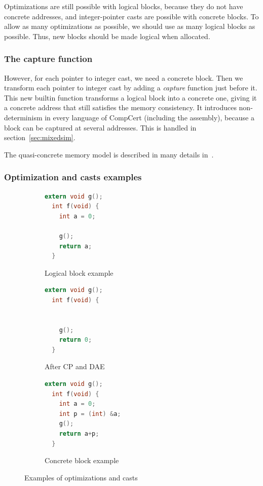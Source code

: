 Optimizations are still possible with logical blocks, because they do not have concrete addresses, and integer-pointer casts are possible with concrete blocks.
To allow as many optimizations as possible, we should use as many logical blocks as possible. Thus, new blocks should be made logical when allocated.

\subsubsection{The capture function}
However, for each pointer to integer cast, we need a concrete block. Then we transform each pointer to integer cast by adding a \textit{capture} function just before it. This new builtin function transforms a logical block into a concrete one, giving it a concrete address that still satisfies the memory consistency.
It introduces non-determinism in every language of CompCert (including the assembly), because a block can be captured at several addresses. This is handled in section~\ref{sec:mixedsim}.

The quasi-concrete memory model is described in many details in~\cite{DBLP:conf/pldi/KangHMGZV15}.
\subsubsection{Optimization and casts examples}

\lstset{}
\begin{figure}
\begin{subfigure}{.33\textwidth}
  \begin{lstlisting}[language=C]
  extern void g();
  int f(void) {
    int a = 0;
    
    g();
    return a;
  }
  \end{lstlisting}
  \caption{Logical block example}
  \label{fig:logical}
\end{subfigure}%
\begin{subfigure}{.33\textwidth}
  \begin{lstlisting}[language=C]
  extern void g();
  int f(void) {

    
    g();
    return 0;
  }
  \end{lstlisting}
  \caption{After CP and DAE}
  \label{fig:cpdae}
\end{subfigure}
\begin{subfigure}{.33\textwidth}
  \begin{lstlisting}[language=C]
  extern void g();
  int f(void) {
    int a = 0;
    int p = (int) &a;
    g();
    return a+p;
  }
  \end{lstlisting}
  \caption{Concrete block example}
  \label{fig:concrete}
\end{subfigure}
\caption{Examples of optimizations and casts}
\label{fig:examples}
\end{figure}

